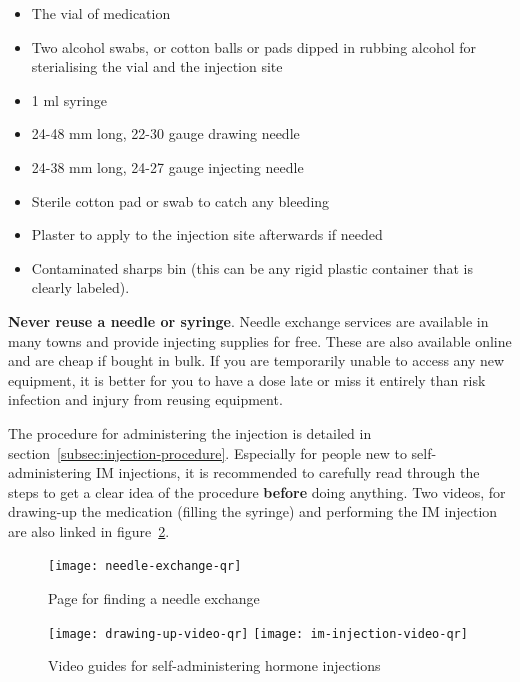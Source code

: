 \documentclass[twoside,a5paper]{article}
\begin{document}
\begin{itemize}
\item The vial of medication
\item Two alcohol swabs, or cotton balls or pads dipped in rubbing
  alcohol for sterialising the vial and the injection site
\item 1 ml syringe
\item 24-48 mm long, 22-30 gauge drawing needle
\item 24-38 mm long, 24-27 gauge injecting needle
\item Sterile cotton pad or swab to catch any bleeding
\item Plaster to apply to the injection site afterwards if needed
\item Contaminated sharps bin (this can be any rigid plastic container
  that is clearly labeled).
\end{itemize}

\textbf{Never reuse a needle or syringe}.  Needle exchange services
are available in many towns and provide injecting supplies for free.
These are also available online and are cheap if bought in bulk.  If
you are temporarily unable to access any new equipment, it is better
for you to have a dose late or miss it entirely than risk infection
and injury from reusing equipment.

The procedure for administering the injection is detailed in
section~\ref{subsec:injection-procedure}.  Especially for people new
to self-administering IM injections, it is recommended to carefully
read through the steps to get a clear idea of the procedure
\textbf{before} doing anything.  Two videos, for drawing-up the
medication (filling the syringe) and performing the IM injection are
also linked in figure~\ref{fig:im-injection-videos}.

\begin{figure}
  \centering
  \texttt{[image: needle-exchange-qr]}
  \caption{Page for finding a needle exchange}
  \label{fig:needle-exchange-qr}
\end{figure}

\begin{figure}
  \centering
  \texttt{[image: drawing-up-video-qr]}
  \hspace{2em}
  \texttt{[image: im-injection-video-qr]}
  \caption{Video guides for self-administering hormone injections}
  \label{fig:im-injection-videos}
\end{figure}

\cleardoublepage
\end{document}

